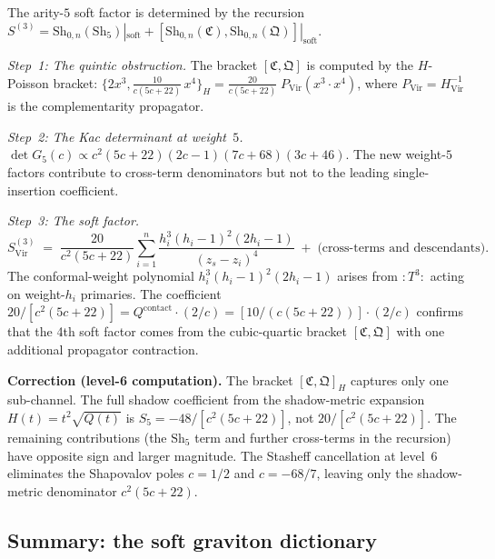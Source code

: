 \documentclass[11pt]{article}
\begin{document}
\begin{computation}
\label{comp:4th-soft-graviton}
The arity-$5$ soft factor is determined by the recursion
$S^{(3)} = \mathrm{Sh}_{0,n}(\mathrm{Sh}_5)|_{\mathrm{soft}} + [\mathrm{Sh}_{0,n}(\mathfrak{C}), \mathrm{Sh}_{0,n}(\mathfrak{Q})]|_{\mathrm{soft}}$.

\medskip\noindent
\emph{Step~1: The quintic obstruction.}  The bracket $[\mathfrak{C}, \mathfrak{Q}]$ is computed by the $H$-Poisson bracket:
$\{2x^3, \frac{10}{c(5c+22)}\,x^4\}_H = \frac{20}{c(5c+22)}\;P_{\mathrm{Vir}}(x^3 \cdot x^4)$,
where $P_{\mathrm{Vir}} = H_{\mathrm{Vir}}^{-1}$ is the complementarity propagator.

\medskip\noindent
\emph{Step~2: The Kac determinant at weight~$5$.}
$\det G_5(c) \propto c^2(5c + 22)(2c - 1)(7c + 68)(3c + 46)$.
The new weight-$5$ factors contribute to cross-term denominators but not to the leading single-insertion coefficient.

\medskip\noindent
\emph{Step~3: The soft factor.}
\begin{equation}\label{eq:4th-soft-from-m5}
\boxed{
S^{(3)}_{\mathrm{Vir}}
\;=\;
\frac{20}{c^2(5c+22)}
\sum_{i=1}^{n}
\frac{h_i^3(h_i-1)^2(2h_i - 1)}{(z_s - z_i)^4}
\;+\; \text{(cross-terms and descendants)}.}
\end{equation}
The conformal-weight polynomial $h_i^3(h_i-1)^2(2h_i-1)$ arises from $:T^3:$ acting on weight-$h_i$ primaries.  The coefficient $20/[c^2(5c+22)] = Q^{\mathrm{contact}} \cdot (2/c) = [10/(c(5c+22))] \cdot (2/c)$ confirms that the 4th soft factor comes from the cubic-quartic bracket $[\mathfrak{C}, \mathfrak{Q}]$ with one additional propagator contraction.

\medskip\noindent
\textbf{Correction (level-6 computation).}  The bracket $[\mathfrak{C}, \mathfrak{Q}]_H$ captures only one sub-channel.  The full shadow coefficient from the shadow-metric expansion $H(t) = t^2\sqrt{Q(t)}$ is $S_5 = -48/[c^2(5c+22)]$, not $20/[c^2(5c+22)]$.  The remaining contributions (the $\mathrm{Sh}_5$ term and further cross-terms in the recursion) have opposite sign and larger magnitude.  The Stasheff cancellation at level~$6$ eliminates the Shapovalov poles $c = 1/2$ and $c = -68/7$, leaving only the shadow-metric denominator $c^2(5c+22)$.
\end{computation}

\subsection{Summary: the soft graviton dictionary}
\end{document}
